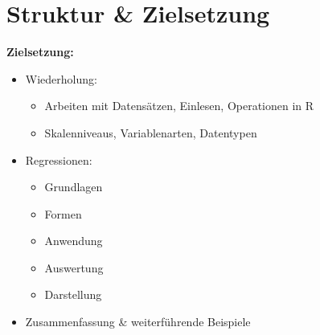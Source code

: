 \documentclass[aspectratio=169, journal, x11names, unknownkeysallowed, hyperref={colorlinks,
linkcolor = SS2,
urlcolor  = F3,
citecolor = F3,
anchorcolor = A4}, 12pt]{beamer}
\begin{document}
\section{Struktur \& Zielsetzung}
\begin{frame}[t]  
  \begin{minipage}[t]{0.45\textwidth}
    \textbf{\large{Zielsetzung:}}
    \begin{itemize}
      \item Wiederholung: 
      \begin{itemize}
        \item Arbeiten mit Datensätzen, Einlesen, Operationen in R
        \item Skalenniveaus, Variablenarten, Datentypen
      \end{itemize}
      \item Regressionen:
      \begin{itemize}
        \item Grundlagen
        \item Formen
        \item Anwendung
        \item Auswertung
        \item Darstellung
      \end{itemize}
      \item Zusammenfassung \& weiterführende Beispiele
    \end{itemize}
  \end{minipage}
  \begin{minipage}{0.45\textwidth}

  \end{minipage}
\end{frame}
\end{document}
